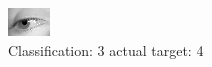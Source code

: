 \begin{figure}[h!]
\begin{center}
\includegraphics[width=0.60\columnwidth]{figures/ID2945_class_3_target_4.png}
\end{center}
\caption{ Classification: 3 actual target: 4}
\label{fig:ID2945_class_3_target_4}
\end{figure}
